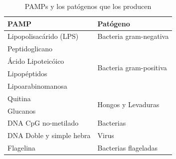 \documentclass[12pt,letterpaper,oneside]{scrbook}
\begin{document}
\begin{table}[h!]
    \begin{center}
        \begin{threeparttable}
            \caption{PAMPs y los patógenos que los producen}\label{tabla:pamps}
            \begin{tabularx}{0.7\textwidth}{l X}
                \toprule
                PAMP & Patógeno \\
                \midrule
                Lipopolisacárido (LPS)      & Bacteria gram-negativa                    \\
                \midrule
                Peptidoglicano              & \multirow{4}{*}{Bacteria gram-positiva}   \\
                Ácido Lipoteicóico          &                                           \\
                Lipopéptidos                &                                           \\
                Lipoarabinomanosa           &                                           \\
                \midrule
                Quitina                     & \multirow{2}{*}{Hongos y Levaduras}       \\
                Glucanos                    &                                           \\
                \midrule
                DNA CpG no-metilado         & Bacterias                                 \\
                \midrule
                DNA Doble y simple hebra    & Virus                                     \\
                \midrule
                Flagelina                   & Bacterias flageladas                      \\
                \bottomrule
                \end{tabularx}
                \begin{tablenotes}
                    \item
                \end{tablenotes}
                \end{threeparttable}    
                \end{center}
                \end{table}
\end{document}
